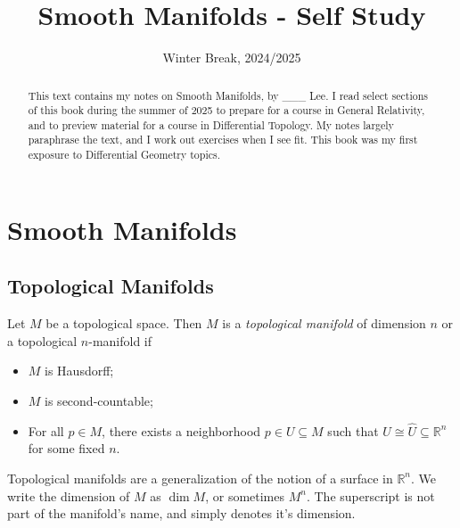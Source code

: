 \documentclass[11pt, letterpaper]{report}
\title{Smooth Manifolds - Self Study}
\date{Winter Break, 2024/2025}
\begin{document}
\maketitle
\begin{abstract}
	This text contains my notes on Smooth Manifolds, by \_\_\_ Lee. I read select sections of this book during the summer of 2025 to prepare for a course in General Relativity, and to preview material for a course in Differential Topology. My notes largely paraphrase the text, and I work out exercises when I see fit. This book was my first exposure to Differential Geometry topics.
\end{abstract}
\tableofcontents
\chapter{Smooth Manifolds}
\section{Topological Manifolds}
\begin{definition}\label{dfn:1.1}
	Let $M$ be a topological space. Then $M$ is a \emph{topological manifold}  of dimension $n$ or a topological $n$-manifold if
	\begin{itemize}
		\item $M$ is Hausdorff;
		\item $M$ is second-countable;
		\item For all $p\in M$, there exists a neighborhood $p\in U \subseteq M$ such that $U\cong \hat{U} \subseteq  \mathbb{R} ^n$ for some fixed $n$.
	\end{itemize}
\end{definition}

Topological manifolds are a generalization of the notion of a surface in $\mathbb{R} ^n$. We write the dimension of $M$ as $\dim M$, or sometimes $M^n$. The superscript is not part of the manifold's name, and simply denotes it's dimension. 
\end{document}
